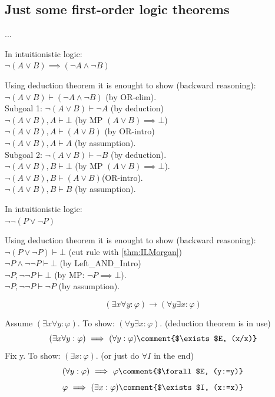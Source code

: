 \subsection{Just some first-order logic theorems}
...
\begin{theorem}
\label{thm:ILMorgan}
In intuitionistic logic:\\
$\neg (A\lor B) \implies (\neg A\land\neg B)$
\end{theorem}
\Proof
Using deduction theorem it is enought to show (backward reasoning):\\
$\neg (A\lor B) \vdash (\neg A\land\neg B)$ (by OR-elim).\\
Subgoal 1: $\neg (A\lor B) \vdash \neg A$ (by deduction)\\
$\neg (A\lor B), A \vdash \bot$ (by MP $(A\lor B)\implies\bot$)\\
$\neg (A\lor B), A \vdash (A\lor B)$ (by OR-intro)\\
$\neg (A\lor B), A \vdash A$ (by assumption).\\
Subgoal 2: $\neg (A\lor B) \vdash \neg B$ (by deduction).\\
$\neg (A\lor B), B \vdash \bot$ (by MP $(A\lor B)\implies\bot$).\\
$\neg (A\lor B), B \vdash (A\lor B)$(OR-intro).\\
$\neg (A\lor B), B \vdash B$ (by assumption).\\
\Done

\begin{theorem} In intuitionistic logic:\\
\label{double neg LEM}
$\neg\neg (P\lor\neg P)$
\end{theorem}
\Proof
Using deduction theorem it is enought to show (backward reasoning):\\
$\neg (P\lor\neg P) \vdash \bot$ (cut rule with \ref{thm:ILMorgan})\\
$\neg P\land\neg\neg P \vdash \bot$ (by Left\_AND\_Intro)\\
$\neg P, \neg\neg P \vdash \bot$ (by MP: $\neg P \implies \bot$).\\
$\neg P, \neg\neg P \vdash \neg P$ (by assumption).\\
\Done

\begin{theorem}
\[
(\exists x \forall y:\varphi) \longrightarrow (\forall y \exists x :\varphi)
\]
\end{theorem}
\Proof
Assume $(\exists x \forall y:\varphi)$. To show: $(\forall y \exists x :\varphi)$. (deduction theorem is in use)
\[
(\exists x \forall y:\varphi)
\IMPLIES
(\forall y:\varphi)
\comment{$\exists$E, (x/x)}
\]
Fix y. To show: $(\exists x :\varphi)$. (or just do $\forall I$ in the end)\\
\[
(\forall y:\varphi)
\IMPLIES
\varphi
\comment{$\forall$E, (y:=y)}
\]
\[
\varphi
\IMPLIES
(\exists x :\varphi)
\comment{$\exists$I, (x:=x)}
\]
\Done

